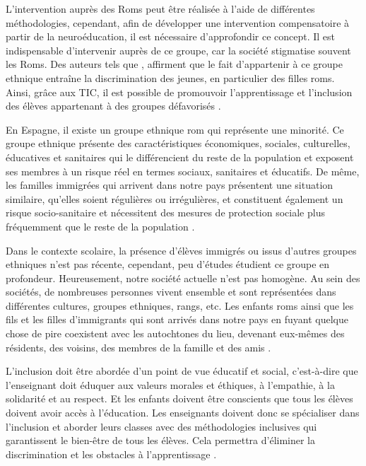 \documentclass[french]{textolivre}
\begin{document}
L'intervention auprès des Roms peut être réalisée à l'aide de différentes méthodologies, cependant, afin de développer une intervention compensatoire à partir de la neuroéducation, il est nécessaire d'approfondir ce concept. Il est indispensable d'intervenir auprès de ce groupe, car la société stigmatise souvent les Roms. Des auteurs tels que \textcite{blasco_education_2006}, affirment que le fait d'appartenir à ce groupe ethnique entraîne la discrimination des jeunes, en particulier des filles roms. Ainsi, grâce aux TIC, il est possible de promouvoir l’apprentissage et l’inclusion des élèves appartenant à des groupes défavorisés \cite{ramos-navas-parejo_uso_2020}.

En Espagne, il existe un groupe ethnique rom qui représente une minorité. Ce groupe ethnique présente des caractéristiques économiques, sociales, culturelles, éducatives et sanitaires qui le différencient du reste de la population et exposent ses membres à un risque réel en termes sociaux, sanitaires et éducatifs. De même, les familles immigrées qui arrivent dans notre pays présentent une situation similaire, qu'elles soient régulières ou irrégulières, et constituent également un risque socio-sanitaire et nécessitent des mesures de protection sociale plus fréquemment que le reste de la population \cite{olivan-gonzalvo_comparacion_2004}.

Dans le contexte scolaire, la présence d'élèves immigrés ou issus d'autres groupes ethniques n'est pas récente, cependant, peu d'études étudient ce groupe en profondeur. Heureusement, notre société actuelle n'est pas homogène. Au sein des sociétés, de nombreuses personnes vivent ensemble et sont représentées dans différentes cultures, groupes ethniques, rangs, etc. Les enfants roms ainsi que les fils et les filles d'immigrants qui sont arrivés dans notre pays en fuyant quelque chose de pire coexistent avec les autochtones du lieu, devenant eux-mêmes des résidents, des voisins, des membres de la famille et des amis \cite{benavidez_importancia_2019}.

L'inclusion doit être abordée d'un point de vue éducatif et social, c'est-à-dire que l'enseignant doit éduquer aux valeurs morales et éthiques, à l'empathie, à la solidarité et au respect. Et les enfants doivent être conscients que tous les élèves doivent avoir accès à l'éducation. Les enseignants doivent donc se spécialiser dans l'inclusion et aborder leurs classes avec des méthodologies inclusives qui garantissent le bien-être de tous les élèves. Cela permettra d'éliminer la discrimination et les obstacles à l'apprentissage \cite{echeita_sarrionandia_pandemia_2020}.
\end{document}
